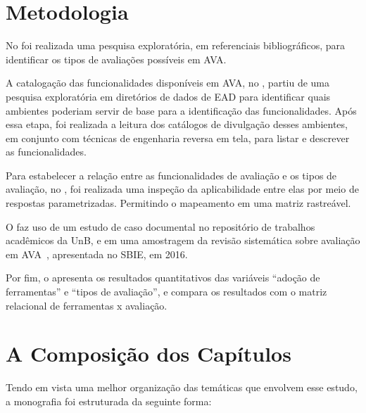 
\section{Metodologia}%
No  foi realizada uma pesquisa exploratória, em referenciais bibliográficos, para identificar os tipos de avaliações possíveis em AVA.

A catalogação das funcionalidades disponíveis em AVA, no , partiu de uma pesquisa exploratória em diretórios de dados de EAD para identificar quais ambientes poderiam servir de base para a identificação das funcionalidades. Após essa etapa, foi realizada a leitura dos catálogos de divulgação desses ambientes, em conjunto com técnicas de engenharia reversa em tela, para listar e descrever as funcionalidades.

Para estabelecer a relação entre as funcionalidades de avaliação e os tipos de avaliação, no , foi realizada uma inspeção da aplicabilidade entre elas por meio de respostas parametrizadas. Permitindo o mapeamento em uma matriz rastreável.  

O  faz uso de um estudo de caso documental no repositório de trabalhos acadêmicos da \acrfull{UnB}, e em uma amostragem da revisão sistemática sobre avaliação em AVA~\cite{Ferreira@2016}, apresentada no \acrfull{SBIE}, em 2016.

Por fim, o  apresenta os resultados quantitativos das variáveis ``adoção de ferramentas'' e ``tipos de avaliação'', e compara os resultados com o matriz relacional de ferramentas x avaliação. 

\section{A Composição dos Capítulos}\label{chap:comp}%

Tendo em vista uma melhor organização das temáticas que envolvem esse estudo, a monografia foi estruturada da seguinte forma:

